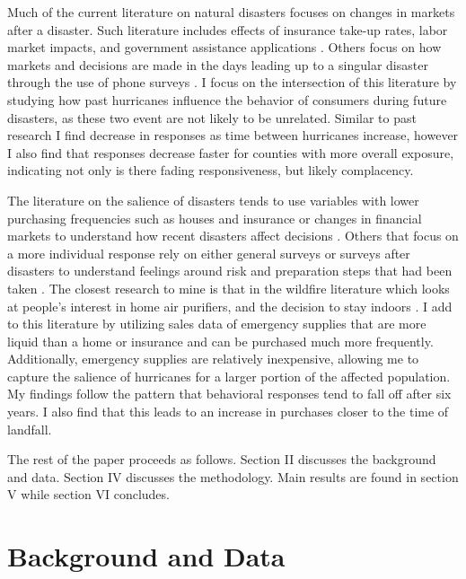 \documentclass{article}
\begin{document}
Much of the current literature on natural disasters focuses on changes in markets after a disaster. Such literature includes effects of insurance take-up rates, labor market impacts, and government assistance applications \citep{hallstrom2005market, gallagher2014learning, mccoy2018wildfire, bakkensen2019flood, groen2008effect, deryugina2017fiscal, deryugina2018economic}. Others focus on how markets and decisions are made in the days leading up to a singular disaster through the use of phone surveys \citep{kelly2012evolution, MeyerEtAl14}. I focus on the intersection of this literature by studying how past hurricanes influence the behavior of consumers during future disasters, as these two event are not likely to be unrelated. Similar to past research I find decrease in responses as time between hurricanes increase, however I also find that responses decrease faster for counties with more overall exposure, indicating not only is there fading responsiveness, but likely complacency.

The literature on the salience of disasters tends to use variables with lower purchasing frequencies such as houses and insurance or changes in financial markets to understand how recent disasters affect decisions \citep{mccoy2018wildfire, bakkensen2019flood, bourdeau2020natural}. Others that focus on a more individual response rely on either general surveys or surveys after disasters to understand feelings around risk and preparation steps that had been taken \citep{lazo2010household, Baker11, MeyerEtAl14}. The closest research to mine is that in the wildfire literature which looks at people's interest in home air purifiers, and the decision to stay indoors \citep{burke2022exposures}. I add to this literature by utilizing sales data of emergency supplies that are more liquid than a home or insurance and can be purchased much more frequently. Additionally, emergency supplies are relatively inexpensive, allowing me to capture the salience of hurricanes for a larger portion of the affected population. My findings follow the pattern that behavioral responses tend to fall off after six years. I also find that this leads to an increase in purchases closer to the time of landfall.

The rest of the paper proceeds as follows. Section II discusses the background and data. Section IV discusses the methodology. Main results are found in section V while section VI concludes.


\section{Background and Data}
\end{document}
